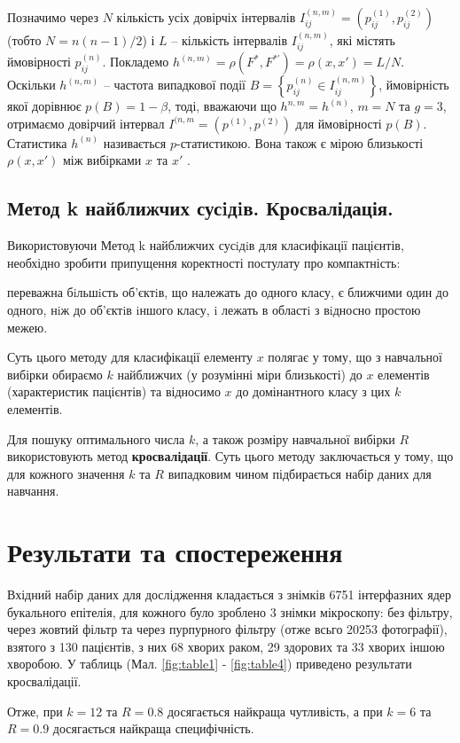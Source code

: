 Позначимо через $N$ кількість усіх довірчіх інтервалів $I_{ij}^{(n,m)} = \left( p_{ij}^{(1)}, p_{ij}^{(2)} \right)$ (тобто $N = {n(n-1)}/{2}$) і $L$ -- кількість інтервалів $I_{ij}^{(n,m)}$, які містять ймовірності $p_{ij}^{(n)}$. Покладемо $h^{(n,m)} = \rho(F^{*}, F^{*'}) = \rho(x, x') = {L}/{N}$. Оскільки $h^{(n,m)}$ -- частота випадкової події $B = \left\{ p_{ij}^{(n)} \in I_{ij}^{(n,m)} \right\}$, ймовірність якої дорівнює $p(B) = 1-\beta$, тоді, вважаючи що $h^{n,m}=h^{(n)}$, $m=N$ та $g=3$, отримаємо довірчий інтервал $I^{(n,m} = \left( p^{(1)}, p^{(2)}\right)$ для ймовірності $p(B)$. Статистика $h^{(n)}$ називається $p$-статистикою. Вона також є мірою близькості $\rho(x, x')$ між вибірками $x$ та $x'$ \parencite{bib:pstatistics}.


\subsection{Метод k найближчих сусiдiв. Кросвалідація.}

Використовуючи Метод k найближчих сусiдiв для класифікації пацієнтів, необхідно зробити припущення коректності постулату про компактність:

\begin{conj}
	переважна бiльшiсть об’єктiв, що належать до одного класу, є ближчими один
	до одного, нiж до об’єктiв iншого класу, i лежать в областi з вiдносно простою межею.
\end{conj}

Суть цього методу для класифікації елементу $x$ полягає у тому, що з навчальної вибірки обираємо $k$ найближчих (у розумінні міри близькості) до $x$ елементів (характеристик пацієнтів) та відносимо $x$ до домінантного класу з цих $k$ елементів.

Для пошуку оптимального числа $k$, а також розміру навчальної вибірки $R$ використовують метод \textbf{кросвалідації}. Суть цього методу заключається у тому, що для кожного значення $k$ та $R$ випадковим чином підбирається набір даних для навчання.


\section{Результати та спостереження}

Вхідний набір даних для дослідження кладається з знімків 6751 інтерфазних ядер букального епітелія, для кожного було зроблено 3 знімки мікроскопу: без фільтру, через жовтий фільтр та через пурпурного фільтру (отже всьго 20253 фотографії), взятого з 130 пацієнтів, з них 68 хворих раком, 29 здорових та 33 хворих іншою хворобою. У таблиць (Мал. \ref{fig:table1} - \ref{fig:table4}) приведено результати кросвалідації.

Отже, при $k = 12$ та $R = 0.8$ досягається найкраща чутливість, а при $k = 6$ та $R = 0.9$ досягається найкраща специфічність.